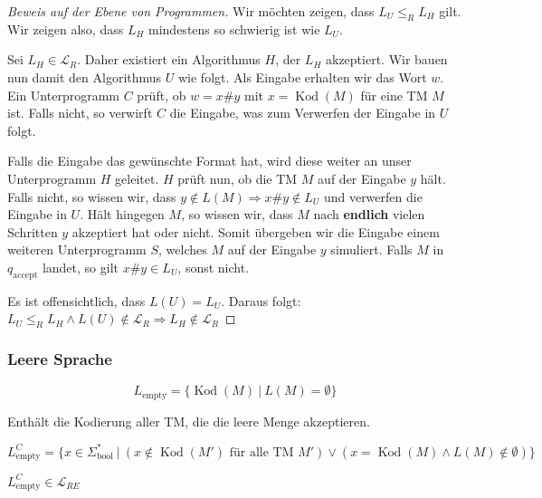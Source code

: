\begin{proof}[Beweis auf der Ebene von Programmen]
Wir möchten zeigen, dass \( L_U \leq_R L_H \) gilt. Wir zeigen also, dass \( L_H \) mindestens so schwierig ist wie \( L_U \).

Sei \( L_H \in \mathcal{L}_R \). Daher existiert ein Algorithmus \( H \), der \( L_H \) akzeptiert. Wir bauen nun damit den Algorithmus \( U \) wie folgt. Als Eingabe erhalten wir das Wort \( w \). Ein Unterprogramm \( C \) prüft, ob \(w = x \# y \) mit \( x = \operatorname{Kod}(M) \) für eine TM \( M \) ist. Falls nicht, so verwirft \( C \) die Eingabe, was zum Verwerfen der Eingabe in \( U \) folgt.

Falls die Eingabe das gewünschte Format hat, wird diese weiter an unser Unterprogramm \( H \) geleitet. \( H \) prüft nun, ob die TM \(M\) auf der Eingabe \( y \) hält. Falls nicht, so wissen wir, dass \( y \notin L(M) \Rightarrow x \# y \notin L_U \) und verwerfen die Eingabe in \( U \). Hält hingegen \( M \), so wissen wir, dass \( M \) nach \textbf{endlich} vielen Schritten \( y \) akzeptiert hat oder nicht. Somit übergeben wir die Eingabe einem weiteren Unterprogramm \( S \), welches \( M \) auf der Eingabe \( y \) simuliert. Falls \( M \) in  \( q_\text{accept} \) landet, so gilt \( x \# y \in L_U \), sonst nicht.

Es ist offensichtlich, dass \( L(U) = L_U \). Daraus folgt: \( L_U \leq_R L_H \land L(U) \notin \mathcal{L}_R \Rightarrow L_H \notin \mathcal{L}_R \)

\end{proof}

\subsubsection{Leere Sprache}
\begin{definition}
\[
L_\text{empty} = \{ \operatorname{Kod}(M) \ |\ L(M) = \emptyset \}
\]

Enthält die Kodierung aller TM, die die leere Menge akzeptieren.\\
\end{definition}

\begin{corollary}
\[
L_\text{empty}^C = \{ x \in \Sigma_\text{bool}^* \ |\ (x \notin \operatorname{Kod}(M') \text{ für alle TM } M') \lor (x = \operatorname{Kod}(M) \land L(M) \notin \emptyset) \}
\]
\end{corollary}

\begin{lemma}
\( L_\text{empty}^C \in \mathcal{L}_{RE} \)\\
\end{lemma}

